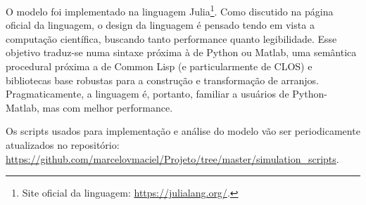 O modelo foi implementado na linguagem Julia\footnote{Site oficial da linguagem:
\url{https://julialang.org/}.}. Como discutido na página oficial da linguagem, o
design da linguagem é pensado tendo em vista a computação científica, buscando
tanto performance quanto legibilidade. Esse objetivo traduz-se numa sintaxe
próxima à de Python ou Matlab, uma semântica procedural próxima a de Common Lisp
(e particularmente de CLOS) e bibliotecas base robustas para a construção e
transformação de arranjos. Pragmaticamente, a linguagem é, portanto, familiar a
usuários de Python-Matlab, mas com melhor performance.

Os scripts usados para implementação e análise do modelo vão ser periodicamente
atualizados no repositório:
\url{https://github.com/marcelovmaciel/Projeto/tree/master/simulation_scripts}.

% 
